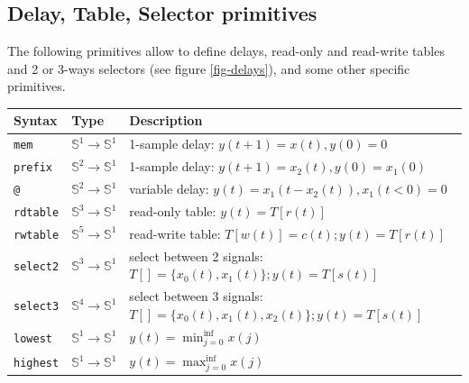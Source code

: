 \subsection{Delay, Table, Selector primitives}

The following primitives allow to define delays, read-only and read-write tables and 2 or 3-ways selectors (see figure \ref{fig-delays}), and some other specific primitives.

\bigskip
\begin{tabular}{|l|l|l|}
	\hline
	\textbf{Syntax}  & \textbf{Type}                             & \textbf{Description}                                                         \\
	\hline

	\texttt{mem}     & $\mathbb{S}^{1}\rightarrow\mathbb{S}^{1}$ & 1-sample delay: 	$y(t+1)=x(t),y(0)=0$                                        \\
	\texttt{prefix}  & $\mathbb{S}^{2}\rightarrow\mathbb{S}^{1}$ & 1-sample delay:  	$y(t+1)=x_{2}(t),y(0)=x_{1}(0)$                            \\
	\texttt{@}       & $\mathbb{S}^{2}\rightarrow\mathbb{S}^{1}$ & variable delay:  	$y(t)=x_{1}(t-x_{2}(t)), x_{1}(t<0)=0$                     \\

	\texttt{rdtable} & $\mathbb{S}^{3}\rightarrow\mathbb{S}^{1}$ & read-only table:	$y(t)=T[r(t)]$                                              \\
	\texttt{rwtable} & $\mathbb{S}^{5}\rightarrow\mathbb{S}^{1}$ & read-write table:	$T[w(t)]=c(t); y(t)=T[r(t)]$                               \\

	\texttt{select2} & $\mathbb{S}^{3}\rightarrow\mathbb{S}^{1}$ & select between 2 signals:	$T[]=\{x_{0}(t),x_{1}(t)\}; y(t)=T[s(t)]$          \\
	\texttt{select3} & $\mathbb{S}^{4}\rightarrow\mathbb{S}^{1}$ & select between 3 signals:	$T[]=\{x_{0}(t),x_{1}(t),x_{2}(t)\}; y(t)=T[s(t)]$ \\

	\texttt{lowest}  & $\mathbb{S}^{1}\rightarrow\mathbb{S}^{1}$ & $y(t)=\min_{j=0}^{\inf} x(j)$                                                \\
	\texttt{highest} & $\mathbb{S}^{1}\rightarrow\mathbb{S}^{1}$ & $y(t)=\max_{j=0}^{\inf} x(j)$                                                \\


	\hline
\end{tabular}
\bigskip

